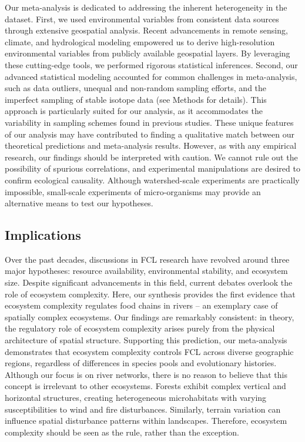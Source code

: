\documentclass[11pt, class=article, crop=false]{standalone}
\begin{document}
Our meta-analysis is dedicated to addressing the inherent heterogeneity in the dataset.
First, we used environmental variables from consistent data sources through extensive geospatial analysis.
Recent advancements in remote sensing, climate, and hydrological modeling empowered us to derive high-resolution environmental variables from publicly available geospatial layers.
By leveraging these cutting-edge tools, we performed rigorous statistical inferences. 
Second, our advanced statistical modeling accounted for common challenges in meta-analysis, such as data outliers, unequal and non-random sampling efforts, and the imperfect sampling of stable isotope data (see Methods for details).
This approach is particularly suited for our analysis, as it accommodates the variability in sampling schemes found in previous studies.
These unique features of our analysis may have contributed to finding a qualitative match between our theoretical predictions and meta-analysis results.
However, as with any empirical research, our findings should be interpreted with caution.
We cannot rule out the possibility of spurious correlations, and experimental manipulations are desired to confirm ecological causality.
Although watershed-scale experiments are practically impossible, small-scale experiments of micro-organisms may provide an alternative means to test our hypotheses.

\subsection{Implications}
Over the past decades, discussions in FCL research have revolved around three major hypotheses: resource availability, environmental stability, and ecosystem size.
Despite significant advancements in this field, current debates overlook the role of ecosystem complexity.
Here, our synthesis provides the first evidence that ecosystem complexity regulates food chains in rivers -- an exemplary case of spatially complex ecosystems.
Our findings are remarkably consistent: in theory, the regulatory role of ecosystem complexity arises purely from the physical architecture of spatial structure.
Supporting this prediction, our meta-analysis demonstrates that ecosystem complexity controls FCL across diverse geographic regions, regardless of differences in species pools and evolutionary histories.
Although our focus is on river networks, there is no reason to believe that this concept is irrelevant to other ecosystems.
Forests exhibit complex vertical and horizontal structures, creating heterogeneous microhabitats with varying susceptibilities to wind and fire disturbances.
Similarly, terrain variation can influence spatial disturbance patterns within landscapes. Therefore, ecosystem complexity should be seen as the rule, rather than the exception.
\end{document}
